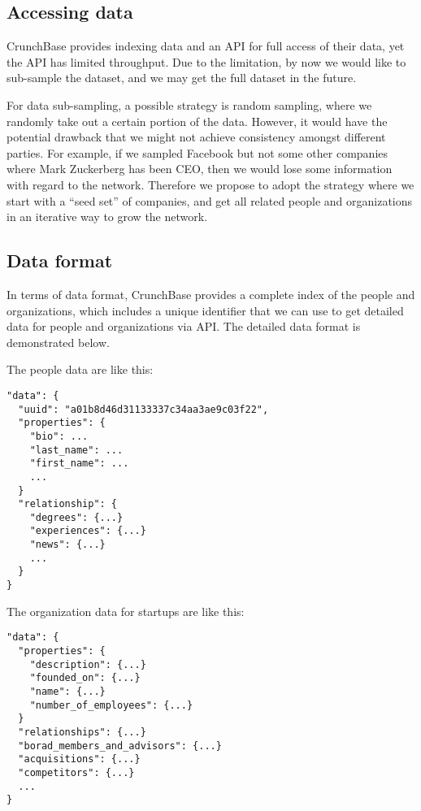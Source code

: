 \subsection{Accessing data}\label{accessing-data}

CrunchBase provides indexing data and an API for full access of their
data, yet the API has limited throughput. Due to the limitation, by now
we would like to sub-sample the dataset, and we may get the full dataset
in the future.

For data sub-sampling, a possible strategy is random sampling, where we
randomly take out a certain portion of the data. However, it would have
the potential drawback that we might not achieve consistency amongst
different parties. For example, if we sampled Facebook but not some
other companies where Mark Zuckerberg has been CEO, then we would lose
some information with regard to the network. Therefore we propose to
adopt the strategy where we start with a ``seed set'' of companies, and
get all related people and organizations in an iterative way to grow the
network.

\subsection{Data format}\label{data-format}

In terms of data format, CrunchBase provides a complete index of the
people and organizations, which includes a unique identifier that we can
use to get detailed data for people and organizations via API. The
detailed data format is demonstrated below.

The people data are like this:

\begin{verbatim}
"data": {
  "uuid": "a01b8d46d31133337c34aa3ae9c03f22",
  "properties": {
    "bio": ...
    "last_name": ...
    "first_name": ...
    ...
  }
  "relationship": {
    "degrees": {...}
    "experiences": {...}
    "news": {...}
    ...
  }
}
\end{verbatim}

The organization data for startups are like this:

\begin{verbatim}
"data": {
  "properties": {
    "description": {...}
    "founded_on": {...}
    "name": {...}
    "number_of_employees": {...}
  }
  "relationships": {...}
  "borad_members_and_advisors": {...}
  "acquisitions": {...}
  "competitors": {...}
  ...
}
\end{verbatim}

